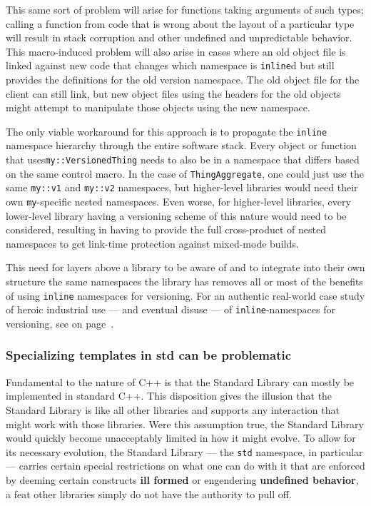 This same sort of problem will arise for functions taking arguments of
such types; calling a function from code that is wrong about the layout
of a particular type will result in stack corruption and other undefined
and unpredictable behavior. This macro-induced problem will also arise in cases where an old object
file is linked against new code that changes which namespace is
\texttt{inline}d but still provides the definitions for the old version
namespace. The old object file for the client can still link, but new
object files using the headers for the old objects might attempt to
manipulate those objects using the new namespace.

The only viable workaround for this approach is to propagate the
\texttt{inline} namespace hierarchy through the entire software stack.
Every object or function that uses\linebreak[4] \texttt{my::VersionedThing} needs to
also be in a namespace that differs based on the same control macro. In
the case of \texttt{ThingAggregate}, one could just use the same
\texttt{my::v1} and \texttt{my::v2} namespaces, but higher-level
libraries would need their own \texttt{my}-specific nested namespaces.
Even worse, for higher-level libraries, every lower-level library having
a versioning scheme of this nature would need to be considered,
resulting in having to provide the full cross-product of nested
namespaces to get link-time protection against mixed-mode builds.

This need for layers above a library to be aware of and to integrate
into their own structure the same namespaces the library has removes all
or most of the benefits of using \texttt{inline} namespaces for
versioning. For an authentic real-world case study of heroic industrial use --- and
eventual disuse --- of \texttt{inline}-namespaces for versioning, see
\textit{} on page~\pageref{appendix:-case-study-of-using-inline-namespaces-for-versioning}.

\subsubsection[Specializing templates in {\tt std} can be problematic]{Specializing templates in {\SubsubsecCode std} can be problematic}\label{specializing-templates-in-std-can-be-problematic}

Fundamental to the nature of C++ is that the Standard Library can mostly
be implemented in standard C++. This disposition gives the illusion that
the Standard Library is like all other libraries and supports any
interaction that might work with those libraries. Were this assumption
true, the Standard Library would quickly become unacceptably limited in
how it might evolve. To allow for its necessary evolution, the Standard
Library --- the \texttt{std} namespace, in particular --- carries
certain special restrictions on what one can do with it that are
enforced by deeming certain constructs \textbf{ill formed} or
engendering \textbf{undefined behavior}, a feat other libraries simply
do not have the authority to pull off.

